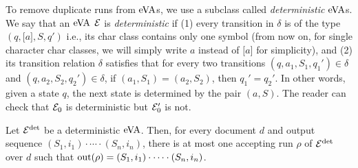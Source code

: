To remove duplicate runs from $\mathrm{eVA}$s, we use a subclass called
\emph{deterministic} $\mathrm{eVA}$s. We say that an $\mathrm{eVA}$ $\mathcal{E}$ is
\emph{deterministic} if (1) every transition in $\delta$ is of the type $(q,
\texttt{[}a\texttt{]}, S, q')$ i.e., its char class contains only one symbol
(from now on, for single character char classes, we will simply write $a$
instead of $\texttt{[}a\texttt{]}$ for simplicity), and (2) its transition
relation $\delta$ satisfies that for every two transitions $(q, a_1, S_1, q_1')
\in \delta$ and $(q, a_2, S_2, q_2') \in \delta$, if $(a_1, S_1) = (a_2, S_2)$,
then $q_1' = q_2'$. In other words, given a state $q$, the next state is
determined by the pair $(a, S)$. The reader can check that $\mathcal{E}_0$ is
deterministic but $\mathcal{E}_0'$ is not.
\begin{proposition} \label{prop:determinization} Let $\mathcal{E}^{{\operatorname{det}}}$ be a
	deterministic $\mathrm{eVA}$. Then, for every document $d$ and output sequence
	$(S_1, i_1)\cdot \cdots \cdot(S_n, i_n)$, there is at most one accepting run
	$\rho$ of $\mathcal{E}^{{\operatorname{det}}}$ over $d$ such that $\operatorname{out}(\rho) = (S_1, i_1)\cdot
	\cdots \cdot(S_n, i_n)$.
\end{proposition}
